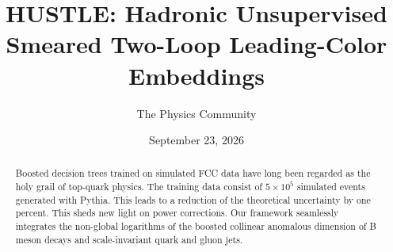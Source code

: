 \documentclass[11pt]{article}
\title{HUSTLE: Hadronic Unsupervised Smeared Two-Loop Leading-Color Embeddings}
\author{The Physics Community}
\date{September 23, 2026}
\numberwithin{equation}{section}
\theoremstyle{definition}
\theoremstyle{remark}
\begin{document}
\maketitle
\begin{abstract}
Boosted decision trees trained on simulated FCC data have long been
regarded as the holy grail of top-quark physics. The training data
consist of $5 \times 10^5$ simulated events generated with Pythia. This
leads to a reduction of the theoretical uncertainty by one percent. This
sheds new light on power corrections. Our framework seamlessly
integrates the non-global logarithms of the boosted collinear anomalous
dimension of B meson decays and scale-invariant quark and gluon jets.
\end{abstract}
\tableofcontents




\nocite{*}


\end{document}
